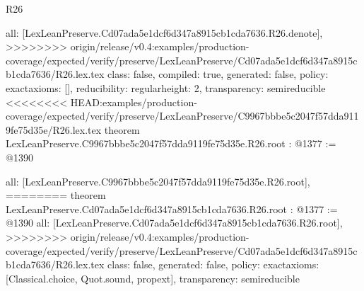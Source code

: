 \begin{lexlean}{R26}
\begin{coremodule}
{{{{{  all: [LexLeanPreserve.Cd07ada5e1dcf6d347a8915cb1cda7636.R26.denote],
>>>>>>>> origin/release/v0.4:examples/production-coverage/expected/verify/preserve/LexLeanPreserve/Cd07ada5e1dcf6d347a8915cb1cda7636/R26.lex.tex
  class: false,
  compiled: true,
  generated: false,
  policy: exact{axioms: []},
  reducibility: regular{height: 2},
  transparency: semireducible
}
<<<<<<<< HEAD:examples/production-coverage/expected/verify/preserve/LexLeanPreserve/C9967bbbe5c2047f57dda9119fe75d35e/R26.lex.tex
theorem LexLeanPreserve.C9967bbbe5c2047f57dda9119fe75d35e.R26.root : @1377 := @1390 {
  all: [LexLeanPreserve.C9967bbbe5c2047f57dda9119fe75d35e.R26.root],
========
theorem LexLeanPreserve.Cd07ada5e1dcf6d347a8915cb1cda7636.R26.root : @1377 := @1390 {
  all: [LexLeanPreserve.Cd07ada5e1dcf6d347a8915cb1cda7636.R26.root],
>>>>>>>> origin/release/v0.4:examples/production-coverage/expected/verify/preserve/LexLeanPreserve/Cd07ada5e1dcf6d347a8915cb1cda7636/R26.lex.tex
  class: false,
  generated: false,
  policy: exact{axioms: [Classical.choice, Quot.sound, propext]},
  transparency: semireducible
}

}}}}}
\end{coremodule}
\end{lexlean}
